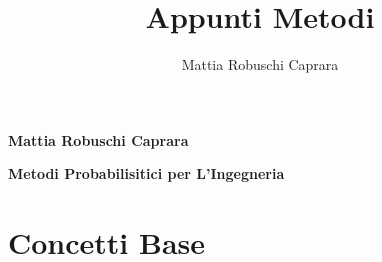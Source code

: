 \documentclass{article}
\title{Appunti Metodi}
\author{Mattia Robuschi Caprara}
\date{}
\begin{document}
\begin{titlepage}

\pagecolor{CoverGreen}

\vspace{25 mm}
\begin{center}
    \large
    {\color{white}\textbf{Mattia Robuschi Caprara}} 
\end{center}

\begin{center}
    \huge
    {\color{white}\textbf{Metodi Probabilisitici per L'Ingegneria}}
\end{center}

\vspace{25 mm}

\begin{figure}[h]
    \centering
\end{figure}

\thispagestyle{empty} 
\end{titlepage}

\newpage
\pagecolor{white}
\tableofcontents
\newpage

\section{Concetti Base}
\end{document}
